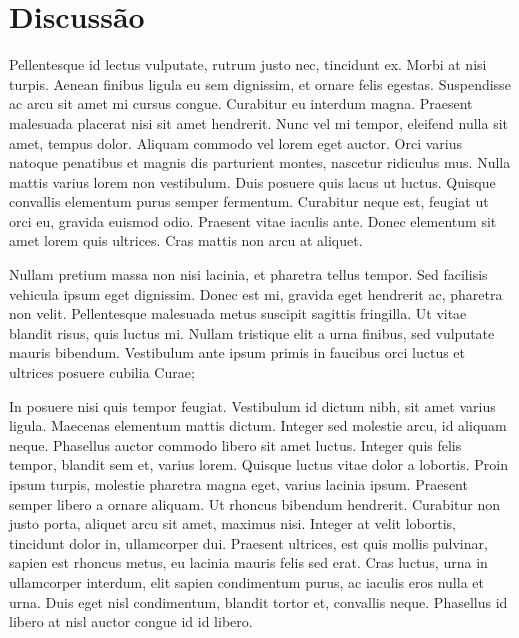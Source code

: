 \section{Discussão}


Pellentesque id lectus vulputate, rutrum justo nec, tincidunt ex. Morbi at nisi turpis. Aenean finibus ligula eu sem dignissim, et ornare felis egestas. Suspendisse ac arcu sit amet mi cursus congue. Curabitur eu interdum magna. Praesent malesuada placerat nisi sit amet hendrerit. Nunc vel mi tempor, eleifend nulla sit amet, tempus dolor. Aliquam commodo vel lorem eget auctor. Orci varius natoque penatibus et magnis dis parturient montes, nascetur ridiculus mus. Nulla mattis varius lorem non vestibulum. Duis posuere quis lacus ut luctus. Quisque convallis elementum purus semper fermentum. Curabitur neque est, feugiat ut orci eu, gravida euismod odio. Praesent vitae iaculis ante. Donec elementum sit amet lorem quis ultrices. Cras mattis non arcu at aliquet.

Nullam pretium massa non nisi lacinia, et pharetra tellus tempor. Sed facilisis vehicula ipsum eget dignissim. Donec est mi, gravida eget hendrerit ac, pharetra non velit. Pellentesque malesuada metus suscipit sagittis fringilla. Ut vitae blandit risus, quis luctus mi. Nullam tristique elit a urna finibus, sed vulputate mauris bibendum. Vestibulum ante ipsum primis in faucibus orci luctus et ultrices posuere cubilia Curae;

In posuere nisi quis tempor feugiat. Vestibulum id dictum nibh, sit amet varius ligula. Maecenas elementum mattis dictum. Integer sed molestie arcu, id aliquam neque. Phasellus auctor commodo libero sit amet luctus. Integer quis felis tempor, blandit sem et, varius lorem. Quisque luctus vitae dolor a lobortis. Proin ipsum turpis, molestie pharetra magna eget, varius lacinia ipsum. Praesent semper libero a ornare aliquam. Ut rhoncus bibendum hendrerit. Curabitur non justo porta, aliquet arcu sit amet, maximus nisi. Integer at velit lobortis, tincidunt dolor in, ullamcorper dui. Praesent ultrices, est quis mollis pulvinar, sapien est rhoncus metus, eu lacinia mauris felis sed erat. Cras luctus, urna in ullamcorper interdum, elit sapien condimentum purus, ac iaculis eros nulla et urna. Duis eget nisl condimentum, blandit tortor et, convallis neque. Phasellus id libero at nisl auctor congue id id libero. 
